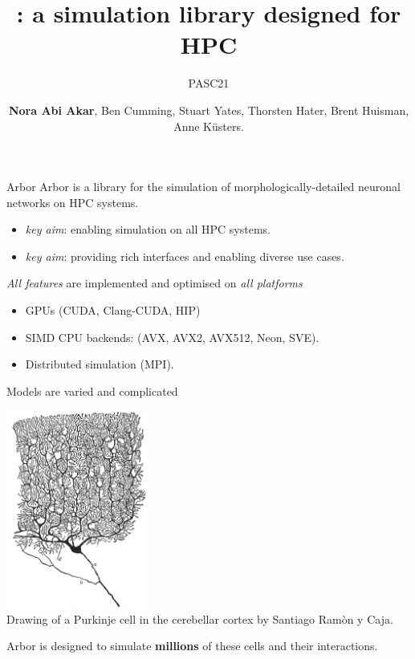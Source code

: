 \documentclass[aspectratio=43]{beamer}
\author{\textbf{Nora Abi Akar}, Ben Cumming, Stuart Yates, Thorsten Hater, Brent Huisman, Anne K\"usters.}
\title{\mytitle \arbor: a simulation library designed for HPC}
\subtitle{PASC21}
\newcommand{\arbor}{{\ttfamily Arbor}\xspace}
\begin{document}
\cscstitle

\begin{frame}[fragile]{\arbor}
    \arbor is a library for the simulation of morphologically-detailed neuronal networks on HPC systems.
    \begin{itemize}
        \item \emph{key aim}: enabling simulation on all HPC systems.
        \item \emph{key aim}: providing rich interfaces and enabling diverse use cases.
    \end{itemize}

    \vspace{10pt}
    \emph{All features} are implemented and optimised on \emph{all platforms}
    \begin{itemize}
        \item GPUs (CUDA, Clang-CUDA, HIP)
        \item SIMD CPU backends: (AVX, AVX2, AVX512, Neon, SVE).
        \item Distributed simulation (MPI).
    \end{itemize}
    \vspace{10pt}

\end{frame}

\begin{frame}[fragile]{Models are varied and complicated}
    \begin{center}
        \includegraphics[width=0.35\textwidth]{images/purkinje_cell.png}
        \\
        {
            \tiny Drawing of a Purkinje cell in the cerebellar cortex by Santiago Ram\`{o}n y Caja.
        }
    \end{center}
    Arbor is designed to simulate \textbf{millions} of these cells and their interactions.
\end{frame}
\end{document}
